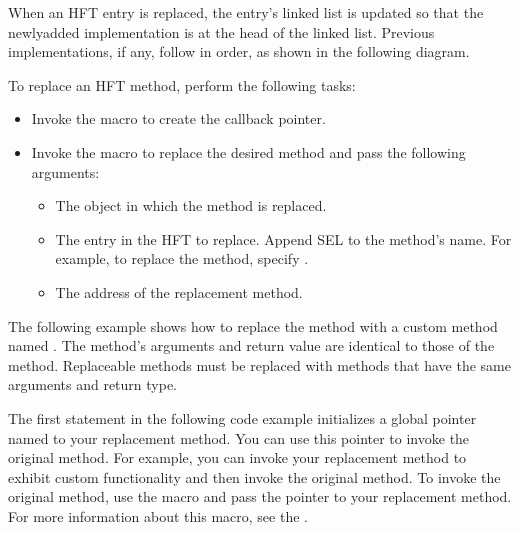 \documentclass[letterpaper,12pt,english,openany,oneside]{sphinxmanual}
\begin{document}
When an HFT entry is replaced, the entry’s linked list is updated so that the newly\sphinxhyphen{}added implementation is at the head of the linked list. Previous implementations, if any, follow in order, as shown in the following diagram.

\noindent{}

To replace an HFT method, perform the following tasks:
\begin{itemize}
\item {} 
Invoke the  macro to create the callback pointer.

\item {} 
Invoke the  macro to replace the desired method and pass the following arguments:
\begin{itemize}
\item {} 
The  object in which the method is replaced.

\item {} 
The entry in the HFT to replace. Append SEL to the method’s name. For example, to replace the  method, specify .

\item {} 
The address of the replacement method.

\end{itemize}

\end{itemize}

The following example shows how to replace the  method with a custom method named . The  method’s arguments and return value are identical to those of the  method. Replaceable methods must be replaced with methods that have the same arguments and return type.

The first statement in the following code example initializes a global pointer named  to your replacement method. You can use this pointer to invoke the original method. For example, you can invoke your replacement method to exhibit custom functionality and then invoke the original method. To invoke the original method, use the  macro and pass the pointer to your replacement method. For more information about this macro, see the .
\end{document}
